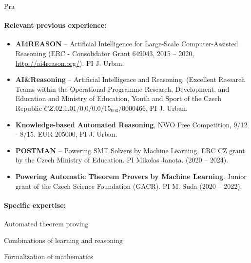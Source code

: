 \begin{sitedescription}{Pra}
\begin{compactitem}
\item %
\end{compactitem}


\paragraph*{Relevant previous experience:}


\begin{itemize}
    \item \textbf{AI4REASON} -- Artificial Intelligence for Large-Scale Computer-Assisted Reasoning (ERC - Consolidator Grant 649043, 2015 -- 2020, \url{http://ai4reason.org/}). PI J. Urban.
    \item \textbf{AI\&Reasoning} -- Artificial Intelligence and Reasoning. (Excellent Research Teams within the Operational Programme Research, Development, and Education and Ministry of Education, Youth and Sport of the Czech Republic \begin{math}CZ.02.1.01/0.0/0.0/15_003/0000466\end{math}. PI J. Urban.
    \item \textbf{Knowledge-based Automated Reasoning}, NWO Free Competition, 9/12 - 8/15. EUR 205000, PI J. Urban.
    \item \textbf{POSTMAN} -- Powering SMT Solvers by Machine Learning. ERC CZ grant by the Czech Ministry of Education.  PI Mikolas Janota. (2020 -- 2024).
    \item \textbf{Powering Automatic Theorem Provers by Machine Learning}. Junior grant of the Czech Science Foundation (GACR). PI M. Suda (2020 -- 2022). 
    \end{itemize}


\paragraph*{Specific expertise:}

\begin{compactitem}
\item Automated theorem proving
\item Combinations of learning and reasoning
\item Formalization of mathematics
\end{compactitem}


\end{sitedescription}
